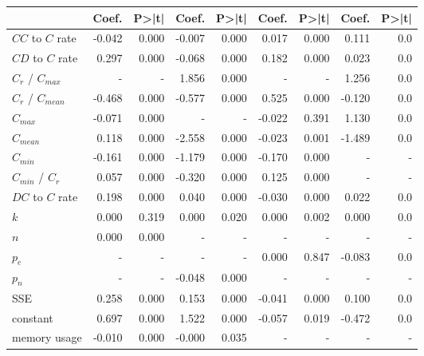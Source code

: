 \begin{tabular}{lrrrrrrrr}
\toprule
{} &  Coef. &  P>|t| &  Coef. &  P>|t| &  Coef. &  P>|t| &  Coef. &  P>|t| \\
\midrule
$CC$ to $C$ rate   & -0.042 &  0.000 & -0.007 &  0.000 &  0.017 &  0.000 &  0.111 &    0.0 \\
$CD$ to $C$ rate   &  0.297 &  0.000 & -0.068 &  0.000 &  0.182 &  0.000 &  0.023 &    0.0 \\
$C_r$ / $C_{max}$  &      - &      - &  1.856 &  0.000 &      - &      - &  1.256 &    0.0 \\
$C_r$ / $C_{mean}$ & -0.468 &  0.000 & -0.577 &  0.000 &  0.525 &  0.000 & -0.120 &    0.0 \\
$C_{max}$          & -0.071 &  0.000 &      - &      - & -0.022 &  0.391 &  1.130 &    0.0 \\
$C_{mean}$         &  0.118 &  0.000 & -2.558 &  0.000 & -0.023 &  0.001 & -1.489 &    0.0 \\
$C_{min}$          & -0.161 &  0.000 & -1.179 &  0.000 & -0.170 &  0.000 &      - &      - \\
$C_{min}$ / $C_r$  &  0.057 &  0.000 & -0.320 &  0.000 &  0.125 &  0.000 &      - &      - \\
$DC$ to $C$ rate   &  0.198 &  0.000 &  0.040 &  0.000 & -0.030 &  0.000 &  0.022 &    0.0 \\
$k$                &  0.000 &  0.319 &  0.000 &  0.020 &  0.000 &  0.002 &  0.000 &    0.0 \\
$n$                &  0.000 &  0.000 &      - &      - &      - &      - &      - &      - \\
$p_e$              &      - &      - &      - &      - &  0.000 &  0.847 & -0.083 &    0.0 \\
$p_n$              &      - &      - & -0.048 &  0.000 &      - &      - &      - &      - \\
SSE                &  0.258 &  0.000 &  0.153 &  0.000 & -0.041 &  0.000 &  0.100 &    0.0 \\
constant           &  0.697 &  0.000 &  1.522 &  0.000 & -0.057 &  0.019 & -0.472 &    0.0 \\
memory usage       & -0.010 &  0.000 & -0.000 &  0.035 &      - &      - &      - &      - \\
\bottomrule
\end{tabular}
